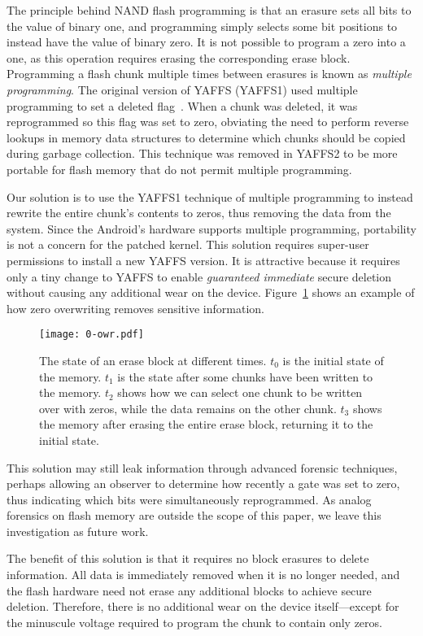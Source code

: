 \documentclass{acmtog}
\begin{document}
The principle behind NAND flash programming is that an erasure sets all bits
to the value of binary one, and programming simply selects some bit positions to
instead have the value of binary zero. It is not possible to program a zero into
a one, as this operation requires erasing the corresponding erase block.
Programming a flash chunk multiple times between erasures is known as \emph{multiple
programming}.
The original version of YAFFS (YAFFS1) used multiple programming to set a
deleted flag~\cite{yaffs}. When a chunk was deleted, it was reprogrammed so this flag was
set to zero, obviating the need to perform reverse lookups in memory data
structures to determine which chunks should be copied during garbage collection. This technique was removed in
YAFFS2 to be more portable for flash memory that do not permit multiple programming.

Our solution is to use the YAFFS1 technique of multiple programming to instead
rewrite the entire chunk's contents to zeros, thus removing the data from the
system. Since the Android's hardware supports multiple programming, portability
is not a concern for the patched kernel.
This solution requires super-user permissions to install a new YAFFS
version. It is attractive because it
requires only a tiny change to YAFFS to enable \emph{guaranteed immediate}
secure deletion without causing any additional wear on the device. 
Figure~\ref{f:0owr} shows an example of how zero overwriting removes
sensitive information.

\begin{figure}[t]
  \centering
  \texttt{[image: 0-owr.pdf]}
  \caption{\small The state of an erase block at different times. $t_0$ is the
  initial state of the memory. $t_1$ is the state after some chunks have been
  written to the memory. $t_2$ shows how we can select one chunk to be written
  over with zeros, while the data remains on the other chunk. $t_3$ shows the
  memory after erasing the entire erase block, returning it to the initial
  state.\label{f:0owr}\normalsize}
\end{figure}


This solution may still leak information through advanced forensic
techniques, perhaps allowing  an observer to determine how recently a gate was set
to zero, thus indicating which bits were simultaneously reprogrammed. As analog forensics on flash memory are outside the
scope of this paper, we leave this investigation as future work.

The benefit of this solution is that it requires no block erasures to delete
information. All data is immediately removed when it is no longer
needed, and the flash hardware need not erase any additional blocks
to achieve secure deletion. Therefore, there is no additional wear on the device
itself---except for the minuscule voltage required to program the
chunk to contain only zeros.
\end{document}
